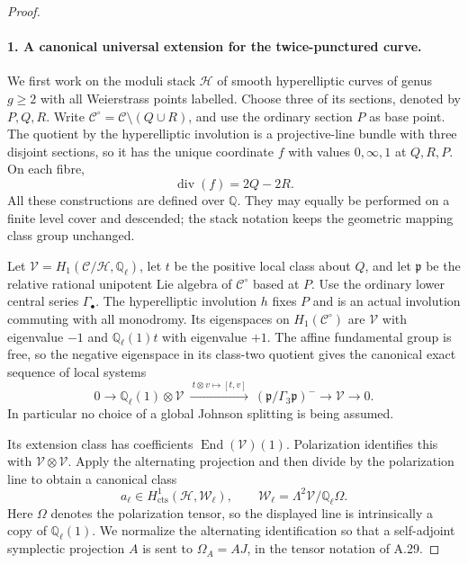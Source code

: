 \begin{proof}
\paragraph{1. A canonical universal extension for the twice-punctured curve.}
We first work on the moduli stack $\mathcal H$ of smooth
hyperelliptic curves of genus $g\ge2$ with all
Weierstrass points labelled. Choose three of its
sections, denoted by $P,Q,R$. Write $\mathcal C^\circ
=\mathcal C\setminus(Q\cup R)$, and use the ordinary
section $P$ as base point. The quotient by the
hyperelliptic involution is a projective-line bundle
with three disjoint sections, so it has the unique
coordinate $f$ with values $0,\infty,1$ at $Q,R,P$.
On each fibre,
\[
                         \operatorname{div}(f)=2Q-2R.
\]
All these constructions are defined over $\mathbb Q$.
They may equally be performed on a finite level cover
and descended; the stack notation keeps the geometric
mapping class group unchanged.

Let $\mathcal V=H_1(\mathcal C/\mathcal H,\mathbb Q_\ell)$,
let $t$ be the positive local class about $Q$, and
let $\mathfrak p$ be the relative rational unipotent
Lie algebra of $\mathcal C^\circ$ based at $P$.
Use the ordinary lower central series $\Gamma_\bullet$.
The hyperelliptic involution $h$ fixes $P$ and is an
actual involution commuting with all monodromy.
Its eigenspaces on $H_1(\mathcal C^\circ)$ are
$\mathcal V$ with eigenvalue $-1$ and
$\mathbb Q_\ell(1)t$ with eigenvalue $+1$.
The affine fundamental group is free, so the negative
eigenspace in its class-two quotient gives the
canonical exact sequence of local systems
\[
 0\longrightarrow \mathbb Q_\ell(1)\otimes\mathcal V
 \ \xrightarrow{\ t\otimes v\mapsto[t,v]\ }\
 (\mathfrak p/\Gamma_3\mathfrak p)^-
 \longrightarrow\mathcal V\longrightarrow0.
                                                        \tag{A.30.3}
\]
In particular no choice of a global Johnson splitting
is being assumed.

Its extension class has coefficients
$\operatorname{End}(\mathcal V)(1)$. Polarization
identifies this with $\mathcal V\otimes\mathcal V$.
Apply the alternating projection and then divide by
the polarization line to obtain a canonical class
\[
 a_\ell\in H^1_{\mathrm{cts}}
       (\mathcal H,\mathcal W_\ell),\qquad
 \mathcal W_\ell=
       \Lambda^2\mathcal V/\mathbb Q_\ell\Omega .
                                                        \tag{A.30.4}
\]
Here $\Omega$ denotes the polarization tensor, so the
displayed line is intrinsically a copy of
$\mathbb Q_\ell(1)$. We normalize the alternating
identification so that a self-adjoint symplectic
projection $A$ is sent to $\Omega_A=AJ$, in the tensor
notation of A.29.


\end{proof}
